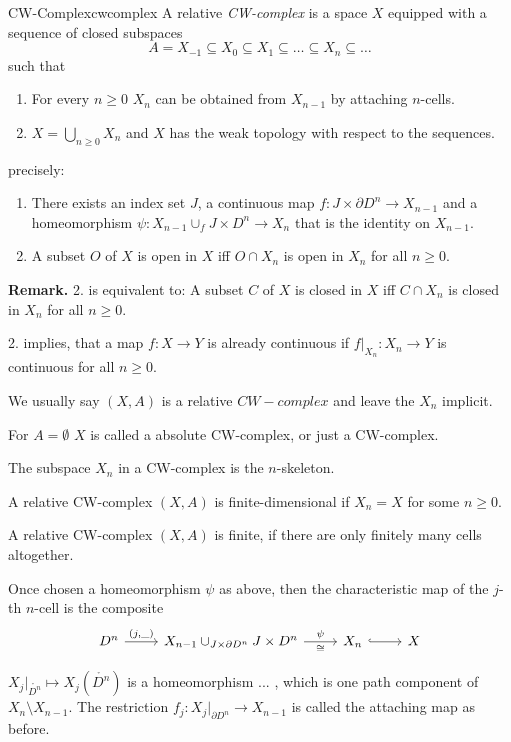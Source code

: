 \documentclass{TemplateLecture}
\begin{document}
\begin{defi}{CW-Complex}{cwcomplex}
    A relative \emph{CW-complex} is a space \(X\) equipped with a sequence of closed subspaces
    \[A = X_{-1} \subseteq X_0 \subseteq X_1 \subseteq \dots \subseteq X_n \subseteq \dots \]
    such that
    \begin{enumerate}
        \item For every \(n \geq 0\) \(X_n\) can be obtained from \(X_{n-1}\) by attaching \(n\)-cells.
        \item \(X = \bigcup_{n \geq 0} X_n\) and \(X\) has the weak topology with respect to the sequences.
    \end{enumerate}

    precisely:
    \begin{enumerate}
        \item There exists an index set \(J\), a continuous map \(f \colon J \times \partial D^n \to X_{n-1}\) and a homeomorphism \(\psi\colon X_{n-1} \cup_f J\times D^n \to X_n\) that is the identity on \(X_{n-1}\).
        \item A subset \(O\) of \(X\) is open in \(X\) iff \(O\cap X_n\) is open in \(X_n\) for all \(n \geq 0\).
    \end{enumerate}
\end{defi}

    \textbf{Remark.} 2. is equivalent to: A subset \(C\) of \(X\) is closed in \(X\) iff \(C\cap X_n\) is closed in \(X_n\) for all \(n \geq 0\).

    2. implies, that a map \(f\colon X\to Y\) is already continuous if \(f\rvert_{X_n}\colon X_n \to Y\) is continuous for all \(n \geq 0\).

\begin{notation}
    We usually say \((X,A)\) is a relative \(CW-complex\) and leave the \(X_n\) implicit.

    For \(A = \emptyset\) \(X\) is called a absolute CW-complex, or just a CW-complex.

    The subspace \(X_n\) in a CW-complex is the \(n\)-skeleton.

    A relative CW-complex \((X,A)\) is finite-dimensional if \(X_n = X\) for some \(n \geq 0\).

    A relative CW-complex \((X,A)\) is finite, if there are only finitely many cells altogether.

    Once chosen a homeomorphism \(\psi\) as above, then the characteristic map  of the \(j\)-th \(n\)-cell is the composite
    \[\begin{tikzcd}
        D^n \ar[r, "{(j, \_)}"] & X_{n-1}\cup_{J\times \partial D^n} J \times D^n \ar[r, "\psi", "\cong"'] & X_n \ar[r, hook] & X
    \end{tikzcd}\]

    \(X_j\rvert_{\mathring{D^n}} \mapsto X_j(\mathring{D^n})\) is a homeomorphism  ... , which is one path component of \(X_n \setminus X_{n-1}\). The restriction \(f_j \colon X_j\rvert_{\partial D^n} \to X_{n-1}\) is called the attaching map as before.
\end{notation}
\end{document}
